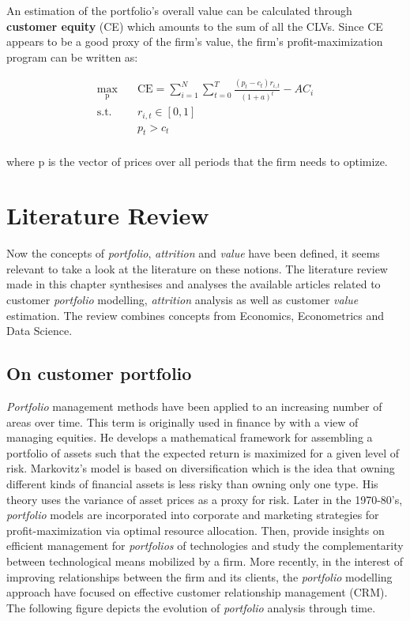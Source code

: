 \documentclass[
]{book}
\begin{document}
An estimation of the portfolio's overall value can be calculated through \textbf{customer equity} (CE) which amounts to the sum of all the CLVs. Since CE appears to be a good proxy of the firm's value, the firm's profit-maximization program can be written as:

\begin{equation}
\begin{aligned}
\max_{\mathrm{p}} \quad & \textrm{CE} = \sum_{i=1}^{N} \sum_{t=0}^{T} \frac{(p_t - c_t)r_{i,t}}{(1+a)^t} - AC_i\\
\textrm{s.t.} \quad & r_{i,t} \in [0, 1]\\
  &p_t > c_t    \\
\end{aligned}
\label{eq:maxprofit}
\end{equation}

where \(\mathrm{p}\) is the vector of prices over all periods that the firm needs to optimize.

\hypertarget{literature}{%
\chapter{Literature Review}\label{literature}}

Now the concepts of \emph{portfolio}, \emph{attrition} and \emph{value} have been defined, it seems relevant to take a look at the literature on these notions. The literature review made in this chapter synthesises and analyses the available articles related to customer \emph{portfolio} modelling, \emph{attrition} analysis as well as customer \emph{value} estimation. The review combines concepts from Economics, Econometrics and Data Science.

\hypertarget{portfolio}{%
\section{On customer portfolio}\label{portfolio}}

\emph{Portfolio} management methods have been applied to an increasing number of areas over time. This term is originally used in finance by \citet{MARKOWITZ} with a view of managing equities. He develops a mathematical framework for assembling a portfolio of assets such that the expected return is maximized for a given level of risk. Markovitz's model is based on diversification which is the idea that owning different kinds of financial assets is less risky than owning only one type. His theory uses the variance of asset prices as a proxy for risk. Later in the 1970-80's, \emph{portfolio} models are incorporated into corporate \citep{WIND} and marketing \citep{DAY} strategies for profit-maximization via optimal resource allocation. Then, \citet{CAPON} provide insights on efficient management for \emph{portfolios} of technologies and study the complementarity between technological means mobilized by a firm. More recently, in the interest of improving relationships between the firm and its clients, the \emph{portfolio} modelling approach have focused on effective customer relationship management (CRM). The following figure depicts the evolution of \emph{portfolio} analysis through time.
\end{document}
